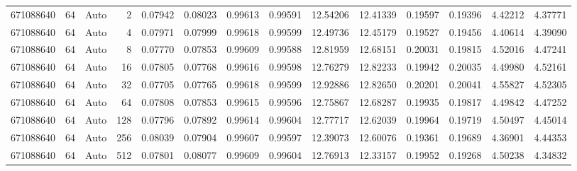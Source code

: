 \begin{tabular}{rrlrrrrrrrrrrr}
671088640 & 64 & Auto & 2 & 0.07942 & 0.08023 & 0.99613 & 0.99591 & 12.54206 & 12.41339 & 0.19597 & 0.19396 & 4.42212 & 4.37771 \\
671088640 & 64 & Auto & 4 & 0.07971 & 0.07999 & 0.99618 & 0.99599 & 12.49736 & 12.45179 & 0.19527 & 0.19456 & 4.40614 & 4.39090 \\
671088640 & 64 & Auto & 8 & 0.07770 & 0.07853 & 0.99609 & 0.99588 & 12.81959 & 12.68151 & 0.20031 & 0.19815 & 4.52016 & 4.47241 \\
671088640 & 64 & Auto & 16 & 0.07805 & 0.07768 & 0.99616 & 0.99598 & 12.76279 & 12.82233 & 0.19942 & 0.20035 & 4.49980 & 4.52161 \\
671088640 & 64 & Auto & 32 & 0.07705 & 0.07765 & 0.99618 & 0.99599 & 12.92886 & 12.82650 & 0.20201 & 0.20041 & 4.55827 & 4.52305 \\
671088640 & 64 & Auto & 64 & 0.07808 & 0.07853 & 0.99615 & 0.99596 & 12.75867 & 12.68287 & 0.19935 & 0.19817 & 4.49842 & 4.47252 \\
671088640 & 64 & Auto & 128 & 0.07796 & 0.07892 & 0.99614 & 0.99604 & 12.77717 & 12.62039 & 0.19964 & 0.19719 & 4.50497 & 4.45014 \\
671088640 & 64 & Auto & 256 & 0.08039 & 0.07904 & 0.99607 & 0.99597 & 12.39073 & 12.60076 & 0.19361 & 0.19689 & 4.36901 & 4.44353 \\
671088640 & 64 & Auto & 512 & 0.07801 & 0.08077 & 0.99609 & 0.99604 & 12.76913 & 12.33157 & 0.19952 & 0.19268 & 4.50238 & 4.34832 \\
\bottomrule
\end{tabular}
